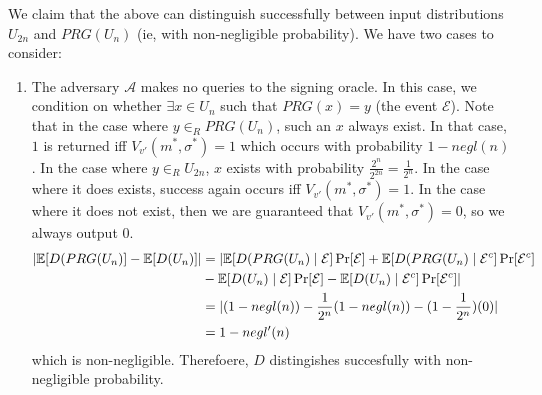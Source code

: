 \documentclass{article}
\begin{document}
\begin{enumerate}
\begin{itemize}
We claim that the above can distinguish successfully between input distributions $U_{2n}$ and 
$PRG(U_n)$ (ie, with non-negligible probability). We have two cases to consider:%

\begin{enumerate}[noitemsep,topsep=\mdcompacttopsep]%

\item{}The adversary $\mathcal{A}$ makes no queries to the signing oracle. In this case,
we condition on whether $\exists x \in U_n$ such that $PRG(x) = y$ (the event $\mathcal{E}$). 
Note that in the case
where $y \in_R PRG(U_n)$, such an $x$ always exist. In that case, $1$ is returned
iff $V_{v'}(m^*,\sigma^*) = 1$ which occurs with probability $1 - negl(n)$. In the case
where $y \in_R U_{2n}$, $x$ exists with probability $\frac{2^n}{2^{2n}} = \frac{1}{2^n}$. In the
case where it does exists, success again occurs iff $V_{v'}(m^*,\sigma^*) = 1$. In the case where
it does not exist, then we are guaranteed that $V_{v'}(m^*,\sigma^*) = 0$, so we always output $0$.
\noindent\noindent\[%
\begin{aligned}
|\E[D(PRG(U_n)] - \E[D(U_n)]| &=  |\E[D(PRG(U_n) \mid \mathcal{E}]\Pr[\mathcal{E}] + \E[D(PRG(U_n) \mid \mathcal{E}^c]\Pr[\mathcal{E}^c] \\
&-\E[D(U_n) \mid \mathcal{E}]\Pr[\mathcal{E}]- \E[D(U_n) \mid \mathcal{E}^c]\Pr[\mathcal{E}^c]| \\
&= |(1-negl(n)) - \frac{1}{2^n}(1 - negl(n)) - (1 - \frac{1}{2^n})(0)| \\
&= 1 - negl'(n)
\end{aligned}
\]%
which is non-negligible. Therefoere, $D$ distingishes succesfully with non-negligible probability.%


\end{enumerate}
\end{itemize}
\end{enumerate}
\end{document}
